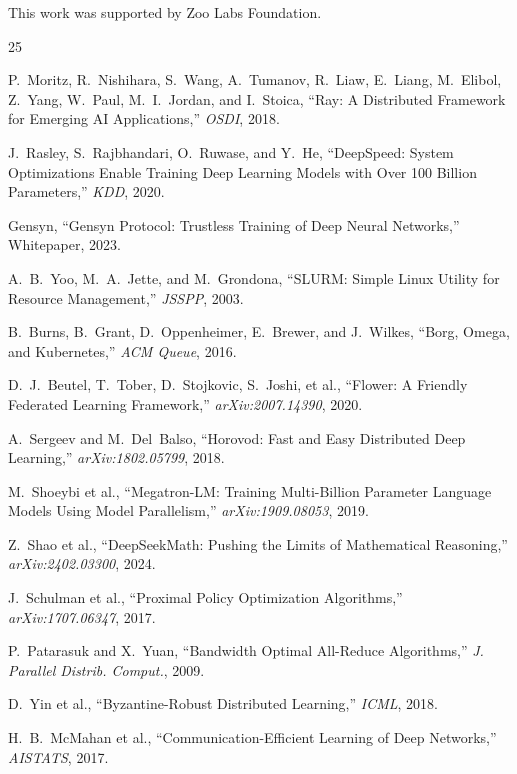 \documentclass[11pt,letterpaper]{article}
\begin{document}
This work was supported by Zoo Labs Foundation.


\begin{thebibliography}{25}

P.~Moritz, R.~Nishihara, S.~Wang, A.~Tumanov, R.~Liaw, E.~Liang, M.~Elibol, Z.~Yang, W.~Paul, M.~I.~Jordan, and I.~Stoica, ``Ray: A Distributed Framework for Emerging AI Applications,'' \textit{OSDI}, 2018.

J.~Rasley, S.~Rajbhandari, O.~Ruwase, and Y.~He, ``DeepSpeed: System Optimizations Enable Training Deep Learning Models with Over 100 Billion Parameters,'' \textit{KDD}, 2020.

Gensyn, ``Gensyn Protocol: Trustless Training of Deep Neural Networks,'' Whitepaper, 2023.

A.~B.~Yoo, M.~A.~Jette, and M.~Grondona, ``SLURM: Simple Linux Utility for Resource Management,'' \textit{JSSPP}, 2003.

B.~Burns, B.~Grant, D.~Oppenheimer, E.~Brewer, and J.~Wilkes, ``Borg, Omega, and Kubernetes,'' \textit{ACM Queue}, 2016.

D.~J.~Beutel, T.~Tober, D.~Stojkovic, S.~Joshi, et al., ``Flower: A Friendly Federated Learning Framework,'' \textit{arXiv:2007.14390}, 2020.

A.~Sergeev and M.~Del~Balso, ``Horovod: Fast and Easy Distributed Deep Learning,'' \textit{arXiv:1802.05799}, 2018.

M.~Shoeybi et al., ``Megatron-LM: Training Multi-Billion Parameter Language Models Using Model Parallelism,'' \textit{arXiv:1909.08053}, 2019.

Z.~Shao et al., ``DeepSeekMath: Pushing the Limits of Mathematical Reasoning,'' \textit{arXiv:2402.03300}, 2024.

J.~Schulman et al., ``Proximal Policy Optimization Algorithms,'' \textit{arXiv:1707.06347}, 2017.

P.~Patarasuk and X.~Yuan, ``Bandwidth Optimal All-Reduce Algorithms,'' \textit{J. Parallel Distrib. Comput.}, 2009.

D.~Yin et al., ``Byzantine-Robust Distributed Learning,'' \textit{ICML}, 2018.

H.~B.~McMahan et al., ``Communication-Efficient Learning of Deep Networks,'' \textit{AISTATS}, 2017.


\end{thebibliography}
\end{document}
